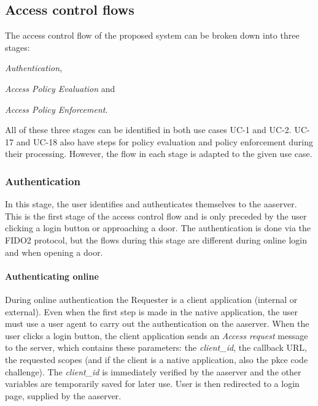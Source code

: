 \subsection{Access control flows}\label{sec:access-control-flows}
The access control flow of the proposed system can be broken down into three stages:
\begin{enumerate*}[label=(\roman*)]
    \item \textit{Authentication},
    \item \textit{Access Policy Evaluation} and
    \item \textit{Access Policy Enforcement}.
\end{enumerate*}

All of these three stages can be identified in both use cases UC-1 and UC-2. UC-17 and UC-18 also have steps for policy evaluation and policy enforcement during their processing. However, the flow in each stage is adapted to the given use case.

\subsubsection{Authentication}
In this stage, the user identifies and authenticates themselves to the \acrshort{aaserver}. This is the first stage of the access control flow and is only preceded by the user clicking a login button or approaching a door. The authentication is done via the FIDO2 protocol, but the flows during this stage are different during online login and when opening a door.

\paragraph{Authenticating online} During online authentication the Requester is a client application (internal or external). Even when the first step is made in the native application, the user must use a user agent to carry out the authentication on the \acrshort{aaserver}. When the user clicks a login button, the client application sends an \textit{Access request} message to the server, which contains these parameters: the \textit{client\_id}, the callback URL, the requested scopes (and if the client is a native application, also the \acrshort{pkce} code challenge). The \textit{client\_id} is immediately verified by the \acrshort{aaserver} and the other variables are temporarily saved for later use. User is then redirected to a login page, supplied by the \acrshort{aaserver}. 

